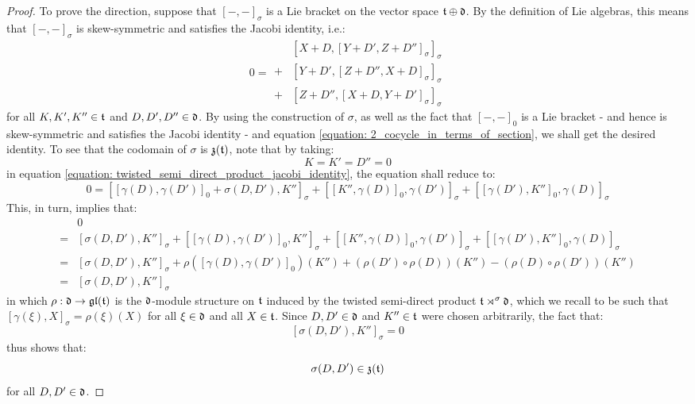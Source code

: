 \begin{proof}
                To prove the  direction, suppose that $[-, -]_{\sigma}$ is a Lie bracket on the vector space $\mathfrak{t} \oplus \mathfrak{d}$. By the definition of Lie algebras, this means that $[-, -]_{\sigma}$ is skew-symmetric and satisfies the Jacobi identity, i.e.:
                    \begin{equation} \label{equation: twisted_semi_direct_product_jacobi_identity}
                        0 =
                        \begin{aligned}
                            & [ X + D, [Y + D', Z + D'']_{\sigma} ]_{\sigma}
                            \\
                            + & [ Y + D', [Z + D'', X + D]_{\sigma} ]_{\sigma}
                            \\
                            + & [ Z + D'', [X + D, Y + D']_{\sigma} ]_{\sigma}
                        \end{aligned}
                    \end{equation}
                for all $K, K', K'' \in \mathfrak{t}$ and $D, D', D'' \in \mathfrak{d}$. By using the construction of $\sigma$, as well as the fact that $[-, -]_0$ is a Lie bracket - and hence is skew-symmetric and satisfies the Jacobi identity - and equation \eqref{equation: 2_cocycle_in_terms_of_section}, we shall get the desired identity. To see that the codomain of $\sigma$ is $\mathfrak{z}(\mathfrak{t})$, note that by taking:
                    $$K = K' = D'' = 0$$
                in equation \eqref{equation: twisted_semi_direct_product_jacobi_identity}, the equation shall reduce to:
                    $$0 = [[\gamma(D), \gamma(D')]_0 + \sigma(D, D'), K'']_{\sigma} + [[K'', \gamma(D)]_0, \gamma(D')]_{\sigma} + [[\gamma(D'), K'']_0, \gamma(D)]_{\sigma}$$
                This, in turn, implies that:
                    $$
                        \begin{aligned}
                            & 0
                            \\
                            = & [\sigma(D, D'), K'']_{\sigma} + [[\gamma(D), \gamma(D')]_0, K'']_{\sigma} + [[K'', \gamma(D)]_0, \gamma(D')]_{\sigma} + [[\gamma(D'), K'']_0, \gamma(D)]_{\sigma}
                            \\
                            = & [\sigma(D, D'), K'']_{\sigma} + \rho( [\gamma(D), \gamma(D')]_0 )(K'') + ( \rho(D') \circ \rho(D) )(K'') - ( \rho(D) \circ \rho(D') )(K'')
                            \\
                            = & [\sigma(D, D'), K'']_{\sigma}
                        \end{aligned}
                    $$
                in which $\rho: \mathfrak{d} \to \mathfrak{gl}(\mathfrak{t})$ is the $\mathfrak{d}$-module structure on $\mathfrak{t}$ induced by the twisted semi-direct product $\mathfrak{t} \rtimes^{\sigma} \mathfrak{d}$, which we recall to be such that $[\gamma(\xi), X]_{\sigma} = \rho(\xi)(X)$ for all $\xi \in \mathfrak{d}$ and all $X \in \mathfrak{t}$. Since $D, D' \in \mathfrak{d}$ and $K'' \in \mathfrak{t}$ were chosen arbitrarily, the fact that:
                    $$[\sigma(D, D'), K'']_{\sigma} = 0$$
                thus shows that:
                    $$\sigma(D, D') \in \mathfrak{z}(\mathfrak{t})$$
                for all $D, D' \in \mathfrak{d}$.


\end{proof}
